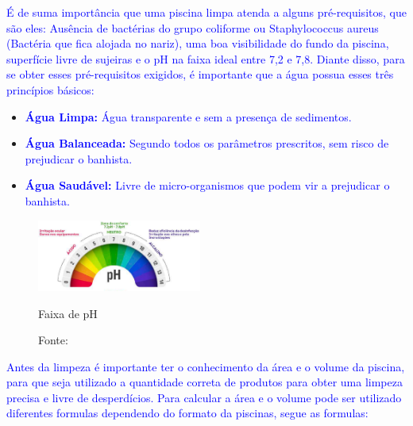
       \textcolor{blue}{É de suma importância que uma piscina limpa atenda a alguns pré-requisitos, que são eles: Ausência de bactérias do grupo coliforme ou Staphylococcus aureus (Bactéria que fica alojada no nariz), uma boa visibilidade do fundo da piscina, superfície livre de sujeiras e o pH na faixa ideal entre 7,2 e 7,8. Diante disso, para se obter esses pré-requisitos exigidos, é importante que a água possua esses três princípios básicos:}
    
       \begin{itemize}
            \item \textbf{\textcolor{blue}{Água Limpa:}} \textcolor{blue}{Água transparente e sem a presença de sedimentos.}
            
            \item \textbf{\textcolor{blue}{Água Balanceada:}} \textcolor{blue}{Segundo todos os parâmetros prescritos, sem risco de prejudicar o banhista.}
             
            \item \textbf{\textcolor{blue}{Água Saudável:}} \textcolor{blue}{Livre de micro-organismos que podem vir a prejudicar o banhista.}
            
        \end{itemize}

        \begin{figure}[H]
                \centering
                \caption{ }  
            	\centering
                \label{fig:cont}
            	\includegraphics[width=0.48\textwidth]{imagens/medidorPh.png}
                \caption*{Faixa de pH}
            	\caption*{Fonte: \cite{guiaTratamento}}
        \end{figure}


        \textcolor{blue}{Antes da limpeza é importante ter o conhecimento da área e o volume da piscina, para que seja utilizado a quantidade correta de produtos para obter uma limpeza precisa e livre de desperdícios. Para calcular a área e o volume pode ser utilizado diferentes formulas dependendo do formato da piscinas, segue as formulas:}

